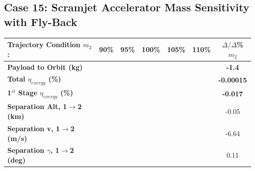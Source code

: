\subsection{Case 15: Scramjet Accelerator Mass Sensitivity with Fly-Back}\label{sec:m2var}

\begin{table}[ht] %
\centering
\begin{tabular}{l c c c c c c} 
	\hline \textbf{Trajectory Condition}   \qquad  $m_{2}$:
	&90\%
	&95\%
	&100\%
	&105\%
	&110\%
	& $\Delta/\Delta$\%$m_{2}$
	\\
	\hline \textbf{Payload to Orbit (kg)}
	& \textbf{\PayloadToOrbitmSPARTANNinety}
	& \textbf{\PayloadToOrbitmSPARTANNinetyFive}
	& \textbf{\PayloadToOrbitmSPARTANStandard}
	& \textbf{\PayloadToOrbitmSPARTANOneHundredFive}
	& \textbf{\PayloadToOrbitmSPARTANOneHundredTen}
	&\textbf{-1.4}
	\\
	\textbf{Total $\eta_{exergy}$ (\%)}
	& \textbf{\totalExergyEffmSPARTANNinety}
	& \textbf{\totalExergyEffmSPARTANNinetyFive}
	& \textbf{\totalExergyEffmSPARTANStandard}
	& \textbf{\totalExergyEffmSPARTANOneHundredFive}
	& \textbf{\totalExergyEffmSPARTANOneHundredTen}
	& \textbf{-0.00015}
	\\
	\hline 
	\textbf{1$^{st}$ Stage $\eta_{exergy}$ (\%)}
	& \textbf{\firstExergyEffmSPARTANNinety}
	& \textbf{\firstExergyEffmSPARTANNinetyFive}
	& \textbf{\firstExergyEffmSPARTANStandard}
	& \textbf{\firstExergyEffmSPARTANOneHundredFive}
	& \textbf{\firstExergyEffmSPARTANOneHundredTen}
	& \textbf{-0.017}
	\\
	\textbf{Separation Alt, 1$\rightarrow$2 (km)}
	& \firstsecondSeparationAltmSPARTANNinety
	& \firstsecondSeparationAltmSPARTANNinetyFive
	& \firstsecondSeparationAltmSPARTANStandard
	& \firstsecondSeparationAltmSPARTANOneHundredFive
	& \firstsecondSeparationAltmSPARTANOneHundredTen
	&-0.05
	\\
	\textbf{Separation v, 1$\rightarrow$2 (m/s)}
	& \firstsecondSeparationvmSPARTANNinety
	& \firstsecondSeparationvmSPARTANNinetyFive
	& \firstsecondSeparationvmSPARTANStandard
	& \firstsecondSeparationvmSPARTANOneHundredFive
	& \firstsecondSeparationvmSPARTANOneHundredTen
	&-6.64
	\\
	\textbf{Separation $\gamma$, 1$\rightarrow$2 (deg)}
	& \firstsecondSeparationgammamSPARTANNinety
	& \firstsecondSeparationgammamSPARTANNinetyFive
	& \firstsecondSeparationgammamSPARTANStandard
	& \firstsecondSeparationgammamSPARTANOneHundredFive
	& \firstsecondSeparationgammamSPARTANOneHundredTen
	&0.11
	\\

\end{tabular}
\end{table}
